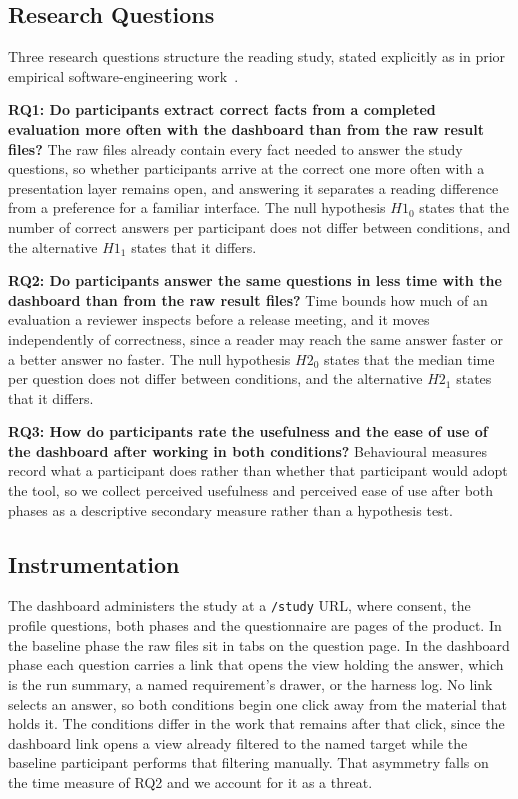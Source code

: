 \documentclass[10pt,conference,a4paper]{IEEEtran}
\begin{document}
\subsection{Research Questions}
\label{sec:rqs}
Three research questions structure the reading %
study, stated explicitly as in prior empirical software-engineering work~\cite{liu2022mscpdp}.

\textbf{RQ1: Do participants extract correct facts from a completed evaluation more often with the dashboard than from the raw result files?}
The raw files already contain every fact needed to answer the study questions, so whether participants arrive at the correct one more often with a presentation layer remains open, and answering it separates a reading difference from a preference for a familiar interface.
The null hypothesis $H1_0$ states that the number of correct answers per participant does not differ between conditions, and the alternative $H1_1$ states that it differs.

\textbf{RQ2: Do participants answer the same questions in less time with the dashboard than from the raw result files?}
Time bounds how much of an evaluation a reviewer inspects before a release meeting, and it moves independently of correctness, since a reader may reach the same answer faster or a better answer no faster.
The null hypothesis $H2_0$ states that the median time per question does not differ between conditions, and the alternative $H2_1$ states that it differs.

\textbf{RQ3: How do participants rate the usefulness and the ease of use of the dashboard after working in both conditions?}
Behavioural measures record what a participant does rather than whether that participant would adopt the tool, so we collect perceived usefulness and perceived ease of use after both phases as a descriptive secondary measure rather than a hypothesis test.

\subsection{Instrumentation}
The dashboard administers the study at a \texttt{/study} URL, where consent, the profile questions, both phases and the questionnaire are pages of the product.
In the baseline phase the raw files sit in tabs on the question page.
In the dashboard phase each question carries a link that opens the view holding the answer, which is the run summary, a named requirement's drawer, or the harness log.
No link selects an answer, so both conditions begin one click away from the material that holds it.
The conditions differ in the work that remains after that click, since the dashboard link opens a view already filtered to the named target while the baseline participant performs that filtering manually.
That asymmetry falls on the time measure of RQ2 and we account for it as a threat.
\end{document}
